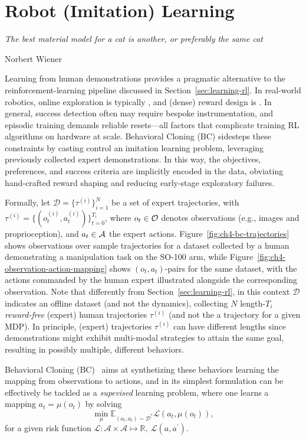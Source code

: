 \section{Robot (Imitation) Learning}
\label{sec:learning-bc-single}

\epigraph{\emph{The best material model for a cat is another, or preferably the same cat}}{Norbert Wiener}

Learning from human demonstrations provides a pragmatic alternative to the reinforcement-learning pipeline discussed in Section~\ref{sec:learning-rl}.
In real-world robotics, online exploration is typically , and (dense) reward design is .
In general, success detection often may require bespoke instrumentation, and episodic training demands reliable resets---all factors that complicate training RL algorithms on hardware at scale.
Behavioral Cloning (BC) sidesteps these constraints by casting control an imitation learning problem, leveraging previously collected expert demonstrations.
In this way, the objectives, preferences, and success criteria are implicitly encoded in the data, obviating hand-crafted reward shaping and reducing early-stage exploratory failures.

Formally, let \( \mathcal D = \{ \tau^{(i)} \}_{i=1}^N \) be a set of expert trajectories, with \( \tau^{(i)} = \{(o_t^{(i)}, a_t^{(i)})\}_{t=0}^{T_i} \), where \(o_t \in \mathcal O \) denotes observations (e.g., images and proprioception), and \(a_t \in \mathcal A \) the expert actions.
Figure~\ref{fig:ch4-bc-trajectories} shows observations over sample trajectories for a dataset collected by a human demonstrating a manipulation task on the SO-100 arm, while Figure~\ref{fig:ch4-observation-action-mapping} shows \( (o_t, a_t) \)-pairs for the same dataset, with the actions commanded by the human expert illustrated alongside the corresponding observation.
Note that differently from Section~\ref{sec:learning-rl}, in this context \( \mathcal D \) indicates an offline dataset (and not the dynamics), collecting \( N \) length-\( T_i \) \emph{reward-free} (expert) human trajectories \( \tau^{(i)} \) (and not the a trajectory for a given MDP).
In principle, (expert) trajectories \( \tau^{(i)} \) can have different lengths since demonstrations might exhibit multi-modal strategies to attain the same goal, resulting in possibly multiple, different behaviors.

Behavioral Cloning (BC)~\citep{pomerleauALVINNAutonomousLand1988a} aims at synthetizing these behaviors learning the mapping from observations to actions, and in its simplest formulation can be effectively be tackled as a \emph{supevised} learning problem, where one learns a mapping \( a_t = \mu(o_t) \) by solving
\begin{equation}\label{eq:loss-minimization-SL}
    \min_{\mu} \mathbb{E}_{(o_t, a_t) \sim \mathcal{D}^*} \mathcal L(a_t, \mu(o_t)),
\end{equation}
for a given risk function \( \mathcal L:  \mathcal A \times \mathcal A \mapsto \mathbb{R}, \ \mathcal L (a, a^\prime) \).

